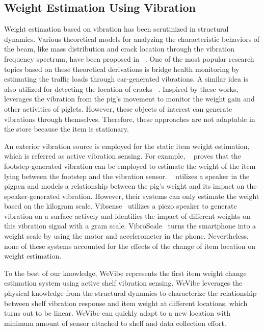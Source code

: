 \subsection{Weight Estimation Using Vibration}
Weight estimation based on vibration has been scrutinized in structural dynamics. Various theoretical models for analyzing the characteristic behaviors of the beam, like mass distribution and crack location through the vibration frequency spectrum, have been proposed in ~\cite{low2003natural,liu2020diagnosis,Matsumoto2003Mathematical,wynne2022quantifying}. One of the most popular research topics based on these theoretical derivations is bridge health monitoring by estimating the traffic loads through car-generated vibrations\cite{sekiya2018simplified,obrien2020using,yu2016state,liu2023telecomtm}. A similar idea is also utilized for detecting the location of cracks ~\cite{liu2020damage,nguyen2010multi}. Inspired by these works, ~\cite{bonde2021pignet, dong2023pigsense} leverages the vibration from the pig's movement to monitor the weight gain and other activities of piglets. However, these objects of interest can generate vibrations through themselves. Therefore, these approaches are not adaptable in the store because the item is stationary.

An exterior vibration source is employed for the static item weight estimation, which is referred as active vibration sensing. For example, ~\cite{mirshekari2021obstruction} proves that the footstep-generated vibration can be employed to estimate the weight of the item lying between the footstep and the vibration sensor. ~\cite{codling2021masshog} utilizes a speaker in the pigpen and models a relationship between the pig's weight and its impact on the speaker-generated vibration. However, their systems can only estimate the weight based on the kilogram scale. Vibsense~\cite{liu2017vibsense} utilizes a piezo speaker to generate vibration on a surface actively and identifies the impact of different weights on this vibration signal with a gram scale. VibroScale~\cite{zhang2020vibroscale} turns the smartphone into a weight scale by using the motor and accelerometer in the phone. Nevertheless, none of these systems accounted for the effects of the change of item location on weight estimation. 

To the best of our knowledge, WeVibe represents the first item weight change estimation system using active shelf vibration sensing. WeVibe leverages the physical knowledge from the structural dynamics to characterize the relationship between shelf vibration response and item weight at different locations, which turns out to be linear. WeVibe can quickly adapt to a new location with minimum amount of sensor attached to shelf and data collection effort.